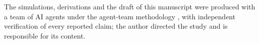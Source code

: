 \begin{acknowledgments}
The simulations, derivations and the draft of this manuscript were produced with a team of AI
agents under the agent-team methodology \cite{agentteam}, with independent verification of every
reported claim; the author directed the study and is responsible for its content.
\end{acknowledgments}
